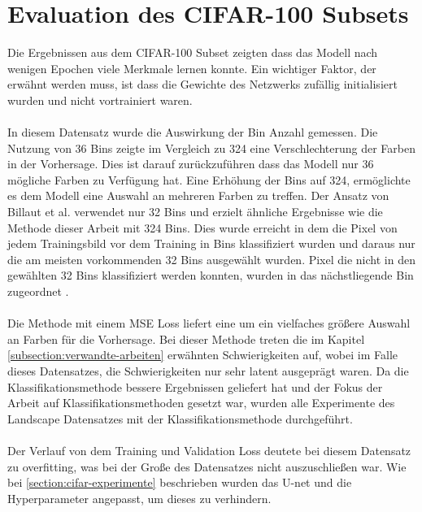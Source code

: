 \section{Evaluation des CIFAR-100 Subsets}
Die Ergebnissen aus dem CIFAR-100 Subset zeigten dass das Modell nach wenigen Epochen viele Merkmale lernen konnte. Ein wichtiger Faktor, der 
erwähnt werden muss, ist dass die Gewichte des Netzwerks zufällig initialisiert wurden und nicht vortrainiert waren. 
\\
\\
In diesem Datensatz wurde die Auswirkung der Bin Anzahl gemessen. Die Nutzung von 36 Bins zeigte im Vergleich zu 324 eine 
Verschlechterung der Farben in der Vorhersage. Dies ist darauf zurückzuführen dass das Modell nur 36 mögliche Farben zu Verfügung hat.
Eine Erhöhung der Bins auf 324, ermöglichte es dem Modell eine Auswahl an mehreren Farben zu treffen. 
Der Ansatz von Billaut et al. verwendet nur 32 Bins und erzielt ähnliche Ergebnisse wie die Methode dieser Arbeit mit 324 Bins.
Dies wurde erreicht in dem die Pixel von jedem Trainingsbild vor dem Training in Bins klassifiziert wurden und daraus nur die am meisten
vorkommenden 32 Bins ausgewählt wurden. Pixel die nicht in den gewählten 32 Bins klassifiziert werden konnten, wurden in das nächstliegende Bin
zugeordnet \cite{billaut2018colorunet}.
\\
\\
Die Methode mit einem MSE Loss liefert eine um ein vielfaches größere Auswahl an Farben für die Vorhersage. Bei dieser Methode treten 
die im Kapitel \ref{subsection:verwandte-arbeiten} erwähnten Schwierigkeiten auf, wobei im Falle dieses Datensatzes, die Schwierigkeiten
nur sehr latent ausgeprägt waren.
Da die Klassifikationsmethode bessere Ergebnissen geliefert hat und der Fokus der Arbeit auf Klassifikationsmethoden gesetzt war,
wurden alle Experimente des Landscape Datensatzes mit der Klassifikationsmethode durchgeführt.
\\
\\
Der Verlauf von dem Training und Validation Loss deutete bei diesem Datensatz zu \gls{overfitting}, was bei der Große des Datensatzes nicht auszuschließen war.
Wie bei \ref{section:cifar-experimente} beschrieben wurden das U-net und die Hyperparameter angepasst, um dieses zu verhindern.

